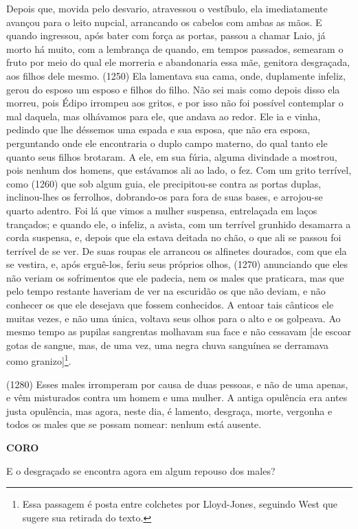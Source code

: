 Depois que, movida pelo desvario, atravessou o vestíbulo, ela
imediatamente avançou para o leito nupcial, arrancando os cabelos com
ambas as mãos. E quando ingressou, após bater com força as portas,
passou a chamar Laio, já morto há muito, com a lembrança de quando, em
tempos passados, semearam o fruto por meio do qual ele morreria e
abandonaria essa mãe, genitora desgraçada, aos filhos dele mesmo. (1250)
Ela lamentava sua cama, onde, duplamente infeliz, gerou do esposo um
esposo e filhos do filho. Não sei mais como depois disso ela morreu,
pois Édipo irrompeu aos gritos, e por isso não foi possível contemplar o
mal daquela, mas olhávamos para ele, que andava ao redor. Ele ia e
vinha, pedindo que lhe déssemos uma espada e sua esposa, que não era
esposa, perguntando onde ele encontraria o duplo campo materno, do qual
tanto ele quanto seus filhos brotaram. A ele, em sua fúria, alguma
divindade a mostrou, pois nenhum dos homens, que estávamos ali ao lado,
o fez. Com um grito terrível, como (1260) que sob algum guia, ele
precipitou-se contra as portas duplas, inclinou-lhes os ferrolhos,
dobrando-os para fora de suas bases, e arrojou-se quarto adentro. Foi lá
que vimos a mulher suspensa, entrelaçada em laços trançados; e quando
ele, o infeliz, a avista, com um terrível grunhido desamarra a corda
suspensa, e, depois que ela estava deitada no chão, o que ali se passou
foi terrível de se ver. De suas roupas ele arrancou os alfinetes
dourados, com que ela se vestira, e, após erguê-los, feriu seus próprios
olhos, (1270) anunciando que eles não veriam os sofrimentos que ele
padecia, nem os males que praticara, mas que pelo tempo restante
haveriam de ver na escuridão os que não deviam, e não conhecer os que
ele desejava que fossem conhecidos. A entoar tais cânticos ele muitas
vezes, e não uma única, voltava seus olhos para o alto e os golpeava. Ao
mesmo tempo as pupilas sangrentas molhavam sua face e não cessavam {[}de
escoar gotas de sangue, mas, de uma vez, uma negra chuva sanguínea se
derramava como granizo{]}\footnote{Essa passagem é posta entre colchetes
  por Lloyd-Jones, seguindo West que sugere sua retirada do texto.}.

(1280) Esses males irromperam por causa de duas pessoas, e não de uma
apenas, e vêm misturados contra um homem e uma mulher. A antiga
opulência era antes justa opulência, mas agora, neste dia, é lamento,
desgraça, morte, vergonha e todos os males que se possam nomear: nenhum
está ausente.

\textbf{CORO}

E o desgraçado se encontra agora em algum repouso dos males?

